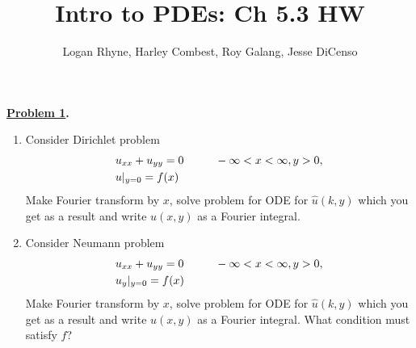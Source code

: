 \documentclass{article}
\title{Intro to PDEs: Ch 5.3 HW}
\author{Logan Rhyne, Harley Combest, Roy Galang, Jesse DiCenso}
\theoremstyle{definition}
\newenvironment{boldenv}{\bfseries\boldmath}{}
\begin{document}
\maketitle

\begin{boldenv}
    \underline{Problem 1}. 
    \begin{enumerate}
        \item Consider Dirichlet problem \begin{align}
        & u_{xx} + u_{yy} = 0 \mkern 50mu -\infty < x < \infty, y > 0,\\
        & u|_{y=0} = f(x)
        \end{align}
    Make Fourier transform by $x$, solve problem for ODE for $\hat{u}(k, y)$ which you get as a result and write $u(x,y)$ as a Fourier integral.
        \item Consider Neumann problem \begin{align}
        & u_{xx} + u_{yy} = 0 \mkern 50mu -\infty < x < \infty, y > 0,\\
        & u_y|_{y=0} = f(x)
        \end{align}
    Make Fourier transform by $x$, solve problem for ODE for $\hat{u}(k, y)$ which you get as a result and write $u(x,y)$ as a Fourier integral. What condition must satisfy $f$?
    \end{enumerate}
\end{boldenv}
\end{document}
